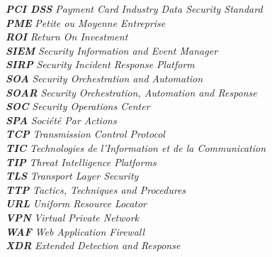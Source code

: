 \textbf{\textit{PCI DSS}} \hspace{0.5cm} \textit{Payment Card Industry Data Security Standard} \\
\textbf{\textit{PME}} \hspace{0.5cm} \textit{Petite ou Moyenne Entreprise} \\
\textbf{\textit{ROI}} \hspace{0.5cm} \textit{Return On Investment} \\
\textbf{\textit{SIEM}} \hspace{0.5cm} \textit{Security Information and Event Manager} \\
\textbf{\textit{SIRP}} \hspace{0.5cm} \textit{Security Incident Response Platform} \\
\textbf{\textit{SOA}} \hspace{0.5cm} \textit{Security Orchestration and Automation} \\
\textbf{\textit{SOAR}} \hspace{0.5cm} \textit{Security Orchestration, Automation and Response} \\
\textbf{\textit{SOC}} \hspace{0.5cm} \textit{Security Operations Center} \\
\textbf{\textit{SPA}} \hspace{0.5cm} \textit{Société Par Actions} \\
\textbf{\textit{TCP}} \hspace{0.5cm} \textit{Transmission Control Protocol} \\
\textbf{\textit{TIC}} \hspace{0.5cm} \textit{Technologies de l'Information et de la Communication} \\
\textbf{\textit{TIP}} \hspace{0.5cm} \textit{Threat Intelligence Platforms} \\
\textbf{\textit{TLS}} \hspace{0.5cm} \textit{Transport Layer Security} \\
\textbf{\textit{TTP}} \hspace{0.5cm} \textit{Tactics, Techniques and Procedures} \\
\textbf{\textit{URL}} \hspace{0.5cm} \textit{Uniform Resource Locator} \\
\textbf{\textit{VPN}} \hspace{0.5cm} \textit{Virtual Private Network} \\
\textbf{\textit{WAF}} \hspace{0.5cm} \textit{Web Application Firewall} \\
\textbf{\textit{XDR}} \hspace{0.5cm} \textit{Extended Detection and Response} \\